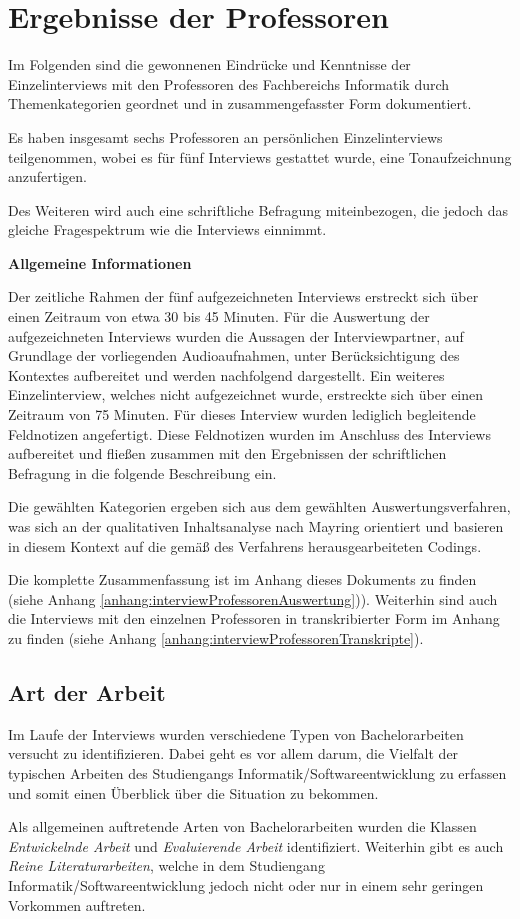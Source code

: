 \documentclass[bibliography=totoc,listof=totoc,BCOR=5mm,DIV=12,oneside]{scrbook}
\begin{document}
\section{Ergebnisse der Professoren}
\par Im Folgenden sind die gewonnenen Eindrücke und Kenntnisse der Einzelinterviews mit den Professoren des Fachbereichs Informatik durch Themenkategorien geordnet und in zusammengefasster Form dokumentiert.
\par Es haben insgesamt sechs Professoren an persönlichen Einzelinterviews teilgenommen, wobei es für fünf Interviews gestattet wurde, eine Tonaufzeichnung anzufertigen.
\par\medskip Des Weiteren wird auch eine schriftliche Befragung miteinbezogen, die jedoch das gleiche Fragespektrum wie die Interviews einnimmt.
\par\bigskip \textbf{Allgemeine Informationen}
\par Der zeitliche Rahmen der fünf aufgezeichneten Interviews erstreckt sich über einen Zeitraum von etwa 30 bis 45 Minuten. Für die Auswertung der aufgezeichneten Interviews wurden die Aussagen der Interviewpartner, auf Grundlage der vorliegenden Audioaufnahmen, unter Berücksichtigung des Kontextes aufbereitet und werden nachfolgend dargestellt. Ein weiteres Einzelinterview, welches nicht aufgezeichnet wurde, erstreckte sich über einen Zeitraum von 75 Minuten. Für dieses Interview wurden lediglich begleitende Feldnotizen angefertigt. Diese Feldnotizen wurden im Anschluss des Interviews aufbereitet und fließen zusammen mit den Ergebnissen der schriftlichen Befragung in die folgende Beschreibung ein.
\par\medskip Die gewählten Kategorien ergeben sich aus dem gewählten Auswertungsverfahren, was sich an der qualitativen Inhaltsanalyse nach Mayring\citep{Mayring2015} orientiert und basieren in diesem Kontext auf die gemäß des Verfahrens herausgearbeiteten Codings.

\par \bigskip Die komplette Zusammenfassung ist im Anhang dieses Dokuments zu finden (siehe Anhang \ref{anhang:interviewProfessorenAuswertung})). Weiterhin sind auch die Interviews mit den einzelnen Professoren in transkribierter Form im Anhang zu finden (siehe Anhang \ref{anhang:interviewProfessorenTranskripte}).

\newpage
\subsection{Art der Arbeit}
\par Im Laufe der Interviews wurden verschiedene Typen von Bachelorarbeiten versucht zu identifizieren. Dabei geht es vor allem darum, die Vielfalt der typischen Arbeiten des Studiengangs Informatik/Softwareentwicklung zu erfassen und somit einen Überblick über die Situation zu bekommen.
\par \medskip Als allgemeinen auftretende Arten von Bachelorarbeiten wurden die Klassen \textit{Entwickelnde Arbeit}  und \textit{Evaluierende Arbeit} identifiziert. Weiterhin gibt es auch \textit{Reine Literaturarbeiten}, welche in dem Studiengang Informatik/Softwareentwicklung jedoch nicht oder nur in einem sehr geringen Vorkommen auftreten.
\end{document}
